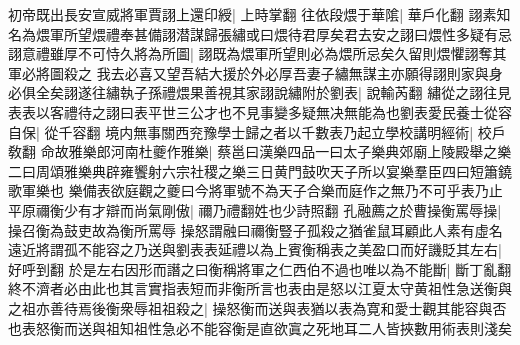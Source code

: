 初帝既出長安宣威將軍賈詡上還印綬|{
	上時掌翻}
往依段煨于華隂|{
	華戶化翻}
詡素知名為煨軍所望煨禮奉甚備詡潜謀歸張繡或曰煨待君厚矣君去安之詡曰煨性多疑有忌詡意禮雖厚不可恃久將為所圖|{
	詡既為煨軍所望則必為煨所忌矣久留則煨懼詡奪其軍必將圖殺之}
我去必喜又望吾結大援於外必厚吾妻子繡無謀主亦願得詡則家與身必俱全矣詡遂往繡執子孫禮煨果善視其家詡說繡附於劉表|{
	說輸芮翻}
繡從之詡往見表表以客禮待之詡曰表平世三公才也不見事變多疑無决無能為也劉表愛民養士從容自保|{
	從千容翻}
境内無事關西兖豫學士歸之者以千數表乃起立學校講明經術|{
	校戶敎翻}
命故雅樂郎河南杜夔作雅樂|{
	蔡邕曰漢樂四品一曰太子樂典郊廟上陵殿舉之樂二曰周頌雅樂典辟雍饗射六宗社稷之樂三日黄門鼓吹天子所以宴樂羣臣四曰短簫鐃歌軍樂也}
樂備表欲庭觀之夔曰今將軍號不為天子合樂而庭作之無乃不可乎表乃止平原禰衡少有才辯而尚氣剛傲|{
	禰乃禮翻姓也少詩照翻}
孔融薦之於曹操衡罵辱操|{
	操召衡為鼓吏故為衡所罵辱}
操怒謂融曰禰衡豎子孤殺之猶雀鼠耳顧此人素有虛名遠近將謂孤不能容之乃送與劉表表延禮以為上賓衡稱表之美盈口而好譏貶其左右|{
	好呼到翻}
於是左右因形而譖之曰衡稱將軍之仁西伯不過也唯以為不能斷|{
	斷丁亂翻}
終不濟者必由此也其言實指表短而非衡所言也表由是怒以江夏太守黄祖性急送衡與之祖亦善待焉後衡衆辱祖祖殺之|{
	操怒衡而送與表猶以表為寛和愛士觀其能容與否也表怒衡而送與祖知祖性急必不能容衡是直欲寘之死地耳二人皆挾數用術表則淺矣}


